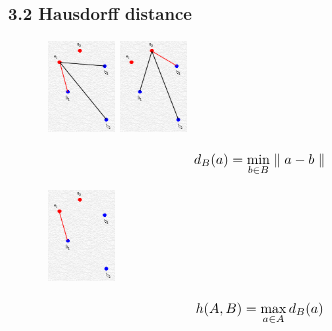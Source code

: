 \documentclass[notheorems,serif,table,compress]{beamer}  %
\begin{document}
\begin{frame}
\frametitle{3.2 Hausdorff distance}

   \begin{figure}[!ht]
    \begin{minipage}{0.3\textwidth}
    \centering
    \includegraphics[width=0.7in]{dian111.png}
    \end{minipage}
    \begin{minipage}{0.3\textwidth}
    \centering
    \includegraphics[width=0.7in]{dian112.png}
    \end{minipage}
   \end{figure}
   \begin{displaymath}
d_{B}(a)=\min_{\begin{subarray}{l}
              b\in B
               \end{subarray}}
        \parallel a-b \parallel
\end{displaymath}
\pause
   \begin{figure}[!ht]
    \centering
    \includegraphics[width=0.7in]{dian41.png}
   \end{figure}
   \begin{displaymath}
h(A,B)=\max_{\begin{subarray}{l}
              a\in A
               \end{subarray}}
       d_{B}(a)
\end{displaymath}
\end{frame}
\end{document}
